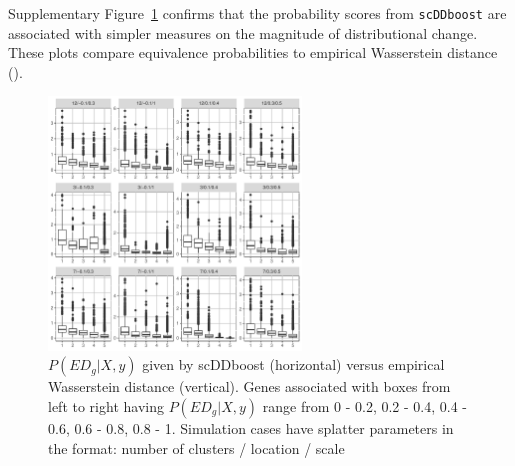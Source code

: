 \documentclass[aoas,preprint]{imsart}
\begin{document}

  

Supplementary Figure~\ref{fig:simu_wad} confirms that the probability scores from \texttt{scDDboost} are 
associated with simpler measures on the magnitude of distributional change.  These plots compare
equivalence probabilities to empirical Wasserstein distance (\cite{dobrushin1972asymptotic}).

\begin{figure}[h!]
\includegraphics[width = 0.6\textwidth]{Figs/simu_wadist.pdf}
\caption{$P(ED_g|X,y)$ given by scDDboost (horizontal) versus empirical Wasserstein distance (vertical). 
Genes associated with boxes from left to right having $P(ED_g|X,y)$ range from 0 - 0.2, 0.2 - 0.4, 0.4 - 0.6, 0.6 - 0.8, 0.8 - 1. 
Simulation cases have splatter parameters in the format: number of clusters / location / scale}
 \label{fig:simu_wad}
\end{figure}


  
  
\end{document}
